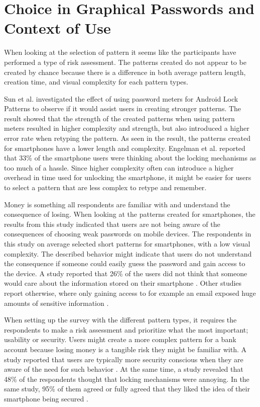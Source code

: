   \section{Choice in Graphical Passwords and Context of Use}\label{sec:discussionContext}
    
    When looking at the selection of pattern it seems like the participants have performed a type of risk assessment. The patterns created do not appear to be created by chance because there is a difference in both average pattern length, creation time, and visual complexity for each pattern types.

    Sun et al. \cite{Sun} investigated the effect of using password meters for Android Lock Patterns to observe if it would assist users in creating stronger patterns. The result showed that the strength of the created patterns when using pattern meters resulted in higher complexity and strength, but also introduced a higher error rate when retyping the pattern. As seen in the result, the patterns created for smartphones have a lower length and complexity. Engelman et al. \cite{Egelman} reported that 33\% of the smartphone users were thinking about the locking mechanisms as too much of a hassle. Since higher complexity often can introduce a higher overhead in time used for unlocking the smartphone, it might be easier for users to select a pattern that are less complex to retype and remember. 

    Money is something all respondents are familiar with and understand the consequence of losing. When looking at the patterns created for smartphones, the results from this study indicated that users are not being aware of the consequences of choosing weak passwords on mobile devices. The respondents in this study on average selected short patterns for smartphones, with a low visual complexity. The described behavior might indicate that users do not understand the consequence if someone could easily guess the password and gain access to the device. A study reported that 26\% of the users did not think that someone would care about the information stored on their smartphone \cite{Egelman}. Other studies report otherwise, where only gaining access to for example an email exposed huge amounts of sensitive information \cite{Egelman}. 

    When setting up the survey with the different pattern types, it requires the respondents to make a risk assessment and prioritize what the most important; usability or security. Users might create a more complex pattern for a bank account because losing money is a tangible risk they might be familiar with. A study reported that users are typically more security conscious when they are aware of the need for such behavior \cite{Sasse}. At the same time, a study revealed that 48\% of the respondents thought that locking mechanisms were annoying. In the same study, 95\% of them agreed or fully agreed that they liked the idea of their smartphone being secured \cite{habits3}. 

